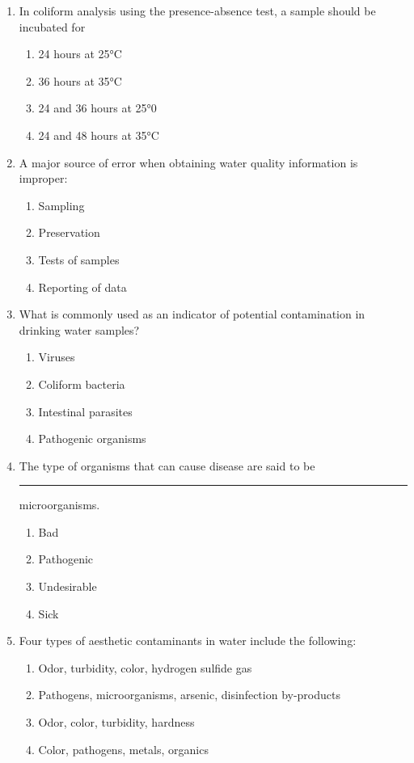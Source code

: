 \begin{enumerate}[1.]
\item 	In coliform analysis using the presence-absence test, a sample should be incubated for	
\begin{enumerate}
\item 	24 hours at 25°C
\item 	36 hours at 35°C
\item 	24 and 36 hours at 25°0
\item 	24 and 48 hours at 35°C
\end{enumerate}

\item A major source of error when obtaining water quality information is improper:
\begin{enumerate}
\item Sampling
\item Preservation
\item Tests of samples
\item Reporting of data
\end{enumerate}

\item What is commonly used as an indicator of potential contamination in drinking water samples?
\begin{enumerate}
\item Viruses
\item Coliform bacteria
\item Intestinal parasites
\item Pathogenic organisms
\end{enumerate}

\item The type of organisms that can cause disease are said to be \rule{2cm}{0.3pt}
microorganisms.
\begin{enumerate}
\item Bad
\item Pathogenic
\item Undesirable
\item Sick
\end{enumerate}

\item Four types of aesthetic contaminants in water include the following:
\begin{enumerate}
\item Odor, turbidity, color, hydrogen sulfide gas
\item Pathogens, microorganisms, arsenic, disinfection by-products
\item Odor, color, turbidity, hardness
\item Color, pathogens, metals, organics
\end{enumerate}


\end{enumerate}

